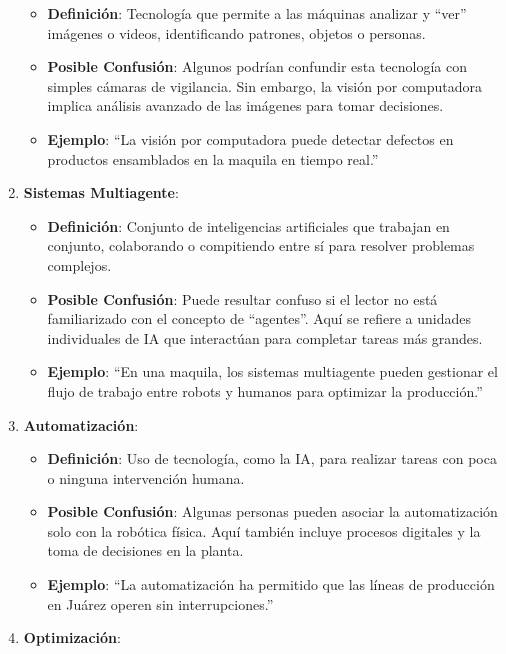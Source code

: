 \documentclass[
  10pt,
  letterpaper,
]{book}
\providecommand{\tightlist}{%
  \setlength{\itemsep}{0pt}\setlength{\parskip}{0pt}}\usepackage{longtable,booktabs,array}
\begin{document}
\begin{enumerate}
  \begin{itemize}
  \tightlist
  \item
    \textbf{Definición}: Tecnología que permite a las máquinas analizar
    y ``ver'' imágenes o videos, identificando patrones, objetos o
    personas.
  \item
    \textbf{Posible Confusión}: Algunos podrían confundir esta
    tecnología con simples cámaras de vigilancia. Sin embargo, la visión
    por computadora implica análisis avanzado de las imágenes para tomar
    decisiones.
  \item
    \textbf{Ejemplo}: ``La visión por computadora puede detectar
    defectos en productos ensamblados en la maquila en tiempo real.''
  \end{itemize}
\item
  \textbf{Sistemas Multiagente}:

  \begin{itemize}
  \tightlist
  \item
    \textbf{Definición}: Conjunto de inteligencias artificiales que
    trabajan en conjunto, colaborando o compitiendo entre sí para
    resolver problemas complejos.
  \item
    \textbf{Posible Confusión}: Puede resultar confuso si el lector no
    está familiarizado con el concepto de ``agentes''. Aquí se refiere a
    unidades individuales de IA que interactúan para completar tareas
    más grandes.
  \item
    \textbf{Ejemplo}: ``En una maquila, los sistemas multiagente pueden
    gestionar el flujo de trabajo entre robots y humanos para optimizar
    la producción.''
  \end{itemize}
\item
  \textbf{Automatización}:

  \begin{itemize}
  \tightlist
  \item
    \textbf{Definición}: Uso de tecnología, como la IA, para realizar
    tareas con poca o ninguna intervención humana.
  \item
    \textbf{Posible Confusión}: Algunas personas pueden asociar la
    automatización solo con la robótica física. Aquí también incluye
    procesos digitales y la toma de decisiones en la planta.
  \item
    \textbf{Ejemplo}: ``La automatización ha permitido que las líneas de
    producción en Juárez operen sin interrupciones.''
  \end{itemize}
\item
  \textbf{Optimización}:


\end{enumerate}
\end{document}
